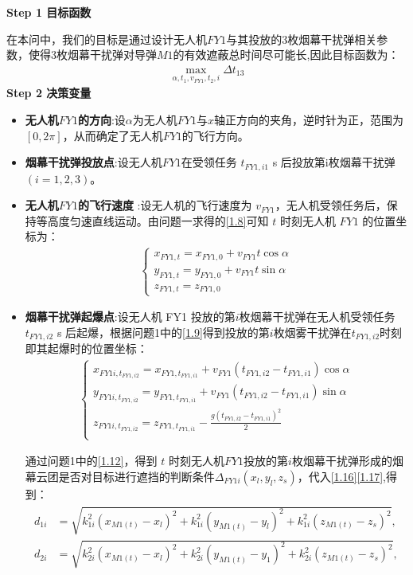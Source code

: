 \documentclass[../main.tex]{subfiles}
\begin{document}
\noindent \textbf{Step 1 目标函数}
\par 在本问中，我们的目标是通过设计无人机$FY1$与其投放的3枚烟幕干扰弹相关参数，使得3枚烟幕干扰弹对导弹$M1$的有效遮蔽总时间尽可能长,因此目标函数为：
\begin{align}\label{12.1}
  \underset{\alpha ,t_1,v_{FY1},t_2,i}{\max}\Delta t_{13}
\end{align}
\noindent \textbf{Step 2 决策变量}

\begin{itemize}
\item \textbf{无人机$FY1$的方向}:设$\alpha $为无人机$FY1$与$x$轴正方向的夹角，逆时针为正，范围为$\left[ 0,2\pi \right] $，从而确定了无人机$FY1$的飞行方向。
\item \textbf{烟幕干扰弹投放点}:设无人机$FY1$在受领任务 \( t_{FY1,i1} \) s 后投放第i枚烟幕干扰弹$(i=1,2,3)$。
\item  \textbf{无人机$FY1$的飞行速度} :设无人机的飞行速度为 \( v_{FY1} \)，无人机受领任务后，保持等高度匀速直线运动。由问题一求得的\eqref{1.8}可知 \( t \) 时刻无人机 \( FY1 \) 的位置坐标为：
\begin{align}\label{12.3}
  \begin{cases}
x_{FY1,t} = x_{FY1,0} + v_{FY1} t \cos\alpha \\
y_{FY1,t} = y_{FY1,0} + v_{FY1} t \sin\alpha \\
z_{FY1,t} = z_{FY1,0}
\end{cases}
\end{align}
\item \textbf{烟幕干扰弹起爆点}:设无人机 FY1 投放的第$i$枚烟幕干扰弹在无人机受领任务 \( t_{FY1,i2} \) s 后起爆，根据问题1中的\eqref{1.9}得到投放的第$i$枚烟雾干扰弹在$t_{FY1,i2}$时刻即其起爆时的位置坐标：
\begin{align}\label{12.4}
\left\{ \begin{array}{l}
	x_{FY1i,t_{FY1,i2}}=x_{FY1,t_{FY1,i1}}+v_{FY1}\left( t_{FY1,i2}-t_{FY1,i1} \right) \cos \alpha\\
	y_{FY1i,t_{FY1,i2}}=y_{FY1,t_{FY1,i1}}+v_{FY1}\left( t_{FY1,i2}-t_{FY1,i1} \right) \sin \alpha\\
	z_{FY1i,t_{FY1,i2}}=z_{FY1,t_{FY1,i1}}-\frac{g\left( t_{FY1,i2}-t_{FY1,i1} \right) ^2}{2}\\
\end{array} \right. 
\end{align}

\par 通过问题1中的\eqref{1.12}，得到 $t$ 时刻无人机$FY1$投放的第$i$枚烟幕干扰弹形成的烟幕云团是否对目标进行遮挡的判断条件$\Delta _{FY1i}\left( x_l,y_l,z_s \right) $，代入\eqref{1.16}\eqref{1.17},得到：
\begin{align}\label{1.1712}
	\begin{aligned}
d_{1i} &= \sqrt{k_{1i}^2(x_{M1(t)} - x_l)^2 + k_{1i}^2(y_{M1(t)} - y_l)^2 + k_{1i}^2(z_{M1(t)} - z_s)^2}, \\
d_{2i} &= \sqrt{k_{2i}^2(x_{M1(t)} - x_l)^2 + k_{2i}^2(y_{M1(t)} - y_1)^2 + k_{2i}^2(z_{M1(t)} - z_s)^2},
\end{aligned}
\end{align}




\end{itemize}
\end{document}
